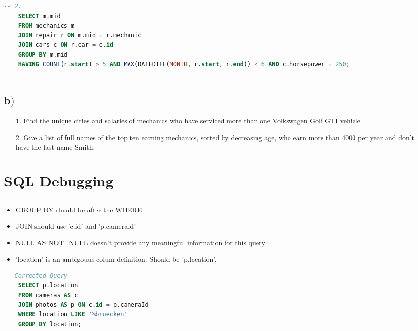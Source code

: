 \begin{lstlisting}[language=SQL]
	-- 2.
	SELECT m.mid 
	FROM mechanics m
	JOIN repair r ON m.mid = r.mechanic
	JOIN cars c ON r.car = c.id
	GROUP BY m.mid
	HAVING COUNT(r.start) > 5 AND MAX(DATEDIFF(MONTH, r.start, r.end)) < 6 AND c.horsepower = 250;  
	
\end{lstlisting}

\subsection{b$)$}

\begin{itemize}
	\item[1.] Find the unique cities and salaries of mechanics who have serviced more than one Volkswagen Golf GTI vehicle
	\item[2.] Give a list of full names of the top ten earning mechanics, sorted by decreasing age, who earn more than 4000 per year and don’t have the last name Smith.
\end{itemize}
	
\section{SQL Debugging}

\subsection{}

\begin{itemize}
	\item GROUP BY should be after the WHERE
	\item JOIN should use 'c.id' and 'p.cameraId'
	\item NULL AS NOT\_NULL doesn't provide any meaningful information for this query
	\item 'location' is an ambigouus colum definition. Should be 'p.location'.
\end{itemize}

\begin{lstlisting}[language=SQL]
	-- Corrected Query
	SELECT p.location
	FROM cameras AS c 
	JOIN photos AS p ON c.id = p.cameraId
	WHERE location LIKE '%bruecken'
	GROUP BY location;
\end{lstlisting}

\subsection{}

